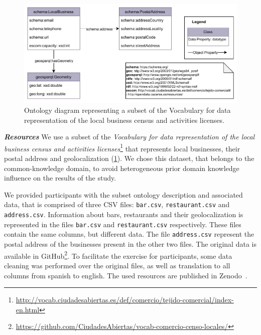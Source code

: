 \begin{figure}[!t]
\centering
\includegraphics[width=\linewidth]{figures/chp5-1_us_onto.pdf}
\caption[Ontology diagram for the user study exercise of Mapeathor]{Ontology diagram representing a subset of the Vocabulary for data representation of the local business census and activities licenses.}
\label{fig:chp5-1_us_onto}
\end{figure}

\noindent\textit{\textbf{Resources}}
We use a subset of the \textit{Vocabulary for data representation of the local business census and activities licenses}\footnote{\url{http://vocab.ciudadesabiertas.es/def/comercio/tejido-comercial/index-en.html}} that represents local businesses, their postal address and geolocalization (\cref{fig:chp5-1_us_onto}). 
We chose this dataset, that belongs to the common-knowledge domain, to avoid heterogeneous prior domain knowledge influence on the results of the study.

We provided participants with the subset ontology description and associated data, that is comprised of three CSV files: \texttt{bar.csv}, \texttt{restaurant.csv} and \texttt{address.csv}. Information about bars, restaurants and their geolocalization is represented in the files \texttt{bar.csv} and \texttt{restaurant.csv} respectively. 
These files contain the same columns, but different data. The file \texttt{address.csv} represent the postal address of the businesses present in the other two files. 
The original data is available in GitHub\footnote{\url{https://github.com/CiudadesAbiertas/vocab-comercio-censo-locales/}}. 
To facilitate the exercise for participants, some data cleaning was performed over the original files, as well as translation to all columns from spanish to english. The used resources are published in Zenodo~\parencite{iglesias-molina_2022_8154522}.



